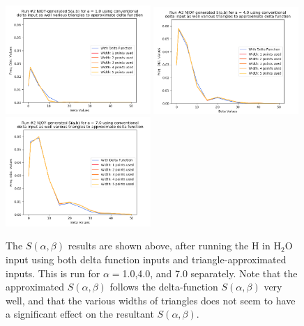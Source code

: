 \documentclass[a4paper]{article}
\begin{document}
\begin{figure}
\centering
\includegraphics[width=0.49\textwidth]{run2_sab_alpha_equals_1.png}
\includegraphics[width=0.49\textwidth]{run2_sab_alpha_equals_4.png}
\includegraphics[width=0.49\textwidth]{run2_sab_alpha_equals_7.png}
\caption{\label{fig:run2_comparing_sab_values} The $S(\alpha,\beta)$ results are shown above, after running the H in H$_2$O input using both delta function inputs and triangle-approximated inputs. This is run for $\alpha=$1.0,4.0, and 7.0 separately. Note that the approximated $S(\alpha,\beta)$ follows the delta-function $S(\alpha,\beta)$ very well, and that the various widths of triangles does not seem to have a significant effect on the resultant $S(\alpha,\beta)$.}
\end{figure}
\end{document}
